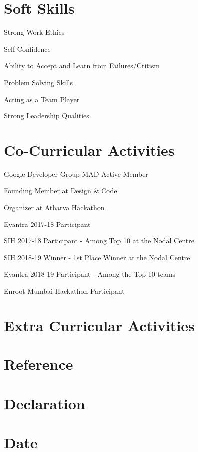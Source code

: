 \documentclass[11pt]{article}
\begin{document}
\section{Soft Skills}
\begin{description} 
\item{Strong Work Ethics}
\item {Self-Confidence}
\item {Ability to Accept and Learn from Failures/Critism}
\item {Problem Solving Skills}
\item {Acting as a Team Player}
\item {Strong Leadership Qualities}
\end{description}

\section{Co-Curricular Activities}
\begin{description}
\item {Google Developer Group MAD Active Member}
\item {Founding Member at Design \& Code}
\item {Organizer at Atharva Hackathon}
\item {Eyantra 2017-18 Participant}
\item {SIH 2017-18 Participant - Among Top 10 at the Nodal Centre}
\item {SIH 2018-19 Winner - 1st Place Winner at the Nodal Centre}
\item {Eyantra 2018-19 Participant - Among the Top 10 teams}
\item {Enroot Mumbai Hackathon Participant}
\end{description}
\section{Extra Curricular Activities}
\section{Reference}
\section{Declaration}
\section{Date}
\end{document}
